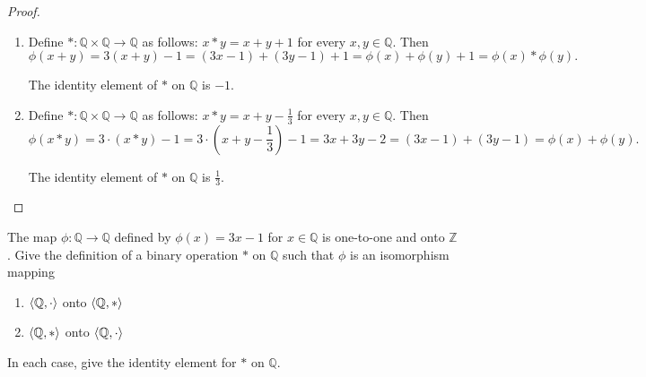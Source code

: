 \begin{proof}
    \begin{enumerate}[label={\textbf{\alph*}},itemsep=0pt,topsep=0pt]
        \item Define $*: \mathbb{Q}\times\mathbb{Q} \to \mathbb{Q}$ as follows: $x * y = x + y + 1$ for every $x, y\in\mathbb{Q}$. Then
              \[
                  \phi(x + y) = 3(x + y) - 1 = (3x - 1) + (3y - 1) + 1 = \phi(x) + \phi(y) + 1 = \phi(x) * \phi(y).
              \]

              The identity element of $*$ on $\mathbb{Q}$ is $-1$.
        \item Define $*: \mathbb{Q}\times\mathbb{Q} \to \mathbb{Q}$ as follows: $x * y = x + y - \frac{1}{3}$ for every $x, y\in\mathbb{Q}$. Then
              \[
                  \phi(x * y) = 3\cdot(x * y) - 1 = 3\cdot\left(x + y - \frac{1}{3}\right) - 1 = 3x + 3y - 2 = (3x - 1) + (3y - 1) = \phi(x) + \phi(y).
              \]

              The identity element of $*$ on $\mathbb{Q}$ is $\frac{1}{3}$.
    \end{enumerate}
\end{proof}

\begin{exercise}
    The map $\phi: \mathbb{Q} \to \mathbb{Q}$ defined by $\phi(x) = 3x - 1$ for $x\in\mathbb{Q}$ is one-to-one and onto $\mathbb{Z}$. Give the definition of a binary operation $*$ on $\mathbb{Q}$ such that $\phi$ is an isomorphism mapping
    \begin{enumerate}[label={\textbf{\alph*}},itemsep=0pt,topsep=0pt]
        \item $\left\langle{\mathbb{Q}, \cdot}\right\rangle$ onto $\left\langle{\mathbb{Q}, *}\right\rangle$
        \item $\left\langle{\mathbb{Q}, *}\right\rangle$ onto $\left\langle{\mathbb{Q}, \cdot}\right\rangle$
    \end{enumerate}

    In each case, give the identity element for $*$ on $\mathbb{Q}$.
\end{exercise}

